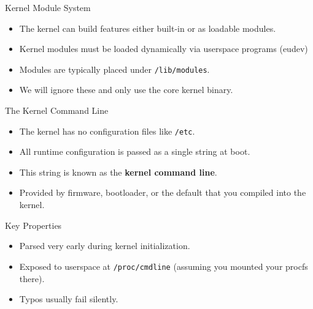 \documentclass{../lecture}
\begin{document}
\begin{frame}[t]{Kernel Module System}
  \begin{itemize}
    \item The kernel can build features either built-in or as loadable modules.
    \item Kernel modules must be loaded dynamically via userspace programs
      (eudev)
    \item Modules are typically placed under \texttt{/lib/modules}.
    \item We will ignore these and only use the core kernel binary.
  \end{itemize}
\end{frame}

\begin{frame}{The Kernel Command Line}
  \begin{itemize}
    \item The kernel has no configuration files like \texttt{/etc}.
    \item All runtime configuration is passed as a single string at boot.
    \item This string is known as the \textbf{kernel command line}.
    \item Provided by firmware, bootloader, or the default that you compiled
      into the kernel.
  \end{itemize}

  \begin{block}{Key Properties}
    \begin{itemize}
      \item Parsed very early during kernel initialization.
      \item Exposed to userspace at \texttt{/proc/cmdline} (assuming you mounted
        your procfs there).
      \item Typos usually fail silently.
    \end{itemize}
  \end{block}
\end{frame}
\end{document}
